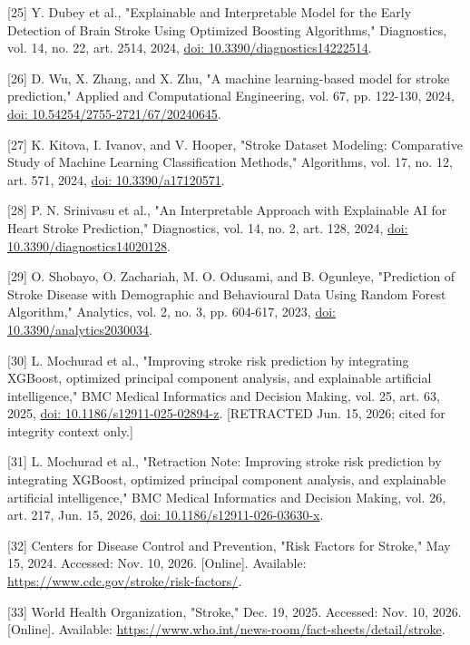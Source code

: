 \documentclass[10pt,twocolumn,letterpaper]{article}
\begin{document}
[25] Y. Dubey et al., "Explainable and Interpretable Model for the Early Detection of Brain Stroke Using Optimized Boosting Algorithms," Diagnostics, vol. 14, no. 22, art. 2514, 2024, \href{https://doi.org/10.3390/diagnostics14222514}{doi: 10.3390/diagnostics14222514}.


[26] D. Wu, X. Zhang, and X. Zhu, "A machine learning-based model for stroke prediction," Applied and Computational Engineering, vol. 67, pp. 122-130, 2024, \href{https://doi.org/10.54254/2755-2721/67/20240645}{doi: 10.54254/2755-2721/67/20240645}.


[27] K. Kitova, I. Ivanov, and V. Hooper, "Stroke Dataset Modeling: Comparative Study of Machine Learning Classification Methods," Algorithms, vol. 17, no. 12, art. 571, 2024, \href{https://doi.org/10.3390/a17120571}{doi: 10.3390/a17120571}.


[28] P. N. Srinivasu et al., "An Interpretable Approach with Explainable AI for Heart Stroke Prediction," Diagnostics, vol. 14, no. 2, art. 128, 2024, \href{https://doi.org/10.3390/diagnostics14020128}{doi: 10.3390/diagnostics14020128}.


[29] O. Shobayo, O. Zachariah, M. O. Odusami, and B. Ogunleye, "Prediction of Stroke Disease with Demographic and Behavioural Data Using Random Forest Algorithm," Analytics, vol. 2, no. 3, pp. 604-617, 2023, \href{https://doi.org/10.3390/analytics2030034}{doi: 10.3390/analytics2030034}.


[30] L. Mochurad et al., "Improving stroke risk prediction by integrating XGBoost, optimized principal component analysis, and explainable artificial intelligence," BMC Medical Informatics and Decision Making, vol. 25, art. 63, 2025, \href{https://doi.org/10.1186/s12911-025-02894-z}{doi: 10.1186/s12911-025-02894-z}. [RETRACTED Jun. 15, 2026; cited for integrity context only.]


[31] L. Mochurad et al., "Retraction Note: Improving stroke risk prediction by integrating XGBoost, optimized principal component analysis, and explainable artificial intelligence," BMC Medical Informatics and Decision Making, vol. 26, art. 217, Jun. 15, 2026, \href{https://doi.org/10.1186/s12911-026-03630-x}{doi: 10.1186/s12911-026-03630-x}.


[32] Centers for Disease Control and Prevention, "Risk Factors for Stroke," May 15, 2024. Accessed: Nov. 10, 2026. [Online]. Available: \href{https://www.cdc.gov/stroke/risk-factors/}{https://www.cdc.gov/stroke/risk-factors/}.


[33] World Health Organization, "Stroke," Dec. 19, 2025. Accessed: Nov. 10, 2026. [Online]. Available: \href{https://www.who.int/news-room/fact-sheets/detail/stroke}{https://www.who.int/news-room/fact-sheets/detail/stroke}.
\end{document}
